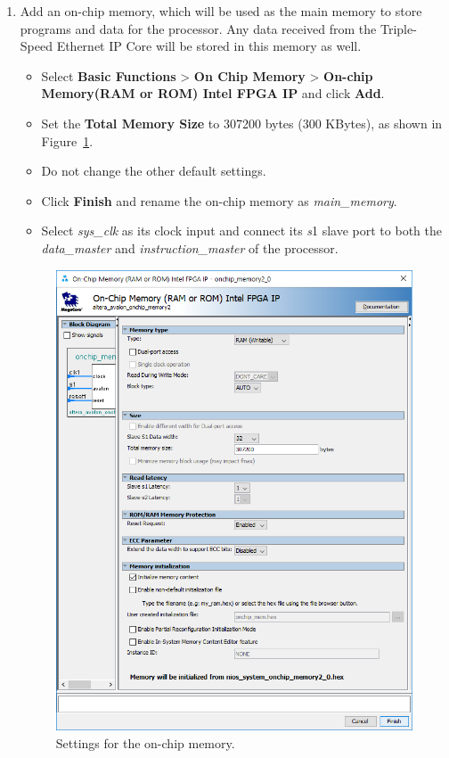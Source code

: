 \documentclass[11pt, twoside, pdftex]{article}
\begin{document}
\begin{enumerate}
	\item Add an on-chip memory, which will be used as the main memory to store programs and data for the processor. Any data received from the Triple-Speed Ethernet IP Core will be stored in this memory as well. 
		\begin{itemize}
			\item Select {\bf Basic Functions} > {\bf On Chip Memory} > {\bf On-chip Memory(RAM or ROM) Intel FPGA IP} and click {\bf Add}.
			\item Set the {\bf Total Memory Size} to 307200 bytes (300 KBytes), as shown in Figure~\ref{fig:onchip_memory1}. 
			\item Do not change the other default settings. 
			\item Click {\bf Finish} and rename the on-chip memory as {\it main\_memory}.
			\item Select {\it sys\_clk} as its clock input and connect its {\it s}1 slave port to both the {\it data\_master} and {\it instruction\_master} of the processor. 
		\end{itemize}
		
		\begin{figure}[H]
			\centering
			  \includegraphics[scale=0.55]{figures/onchip_memory1.png}
			\caption{Settings for the on-chip memory.} 
			\label{fig:onchip_memory1}
		\end{figure}


\end{enumerate}
\end{document}
